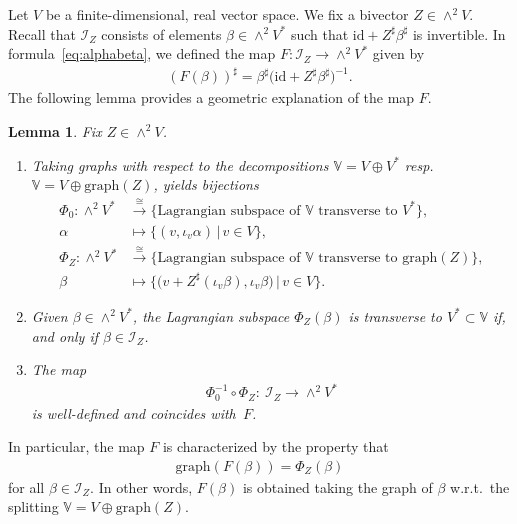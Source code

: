 \documentclass[pdftex]{sigma}
\numberwithin{equation}{section}
\newtheorem{Lemma}[Theorem]{Lemma}
\newcommand{\id}{\mathrm{id}}
\newcommand{\V}{\mathbb{V}}
\begin{document}
Let $V$ be a finite-dimensional, real vector space. We fix a bivector $Z\in \wedge^2V$. Recall that $\mathcal{I}_Z$ consists of elements $\beta\in \wedge^2 V^*$ such that $\mathrm{id} + Z^\sharp \beta^\sharp $ is invertible. In formula~\eqref{eq:alphabeta}, we defined the map $F \colon \mathcal{I}_Z\to \wedge^2 V^*$ given by
\begin{gather*}
(F (\beta))^\sharp = \beta^\sharp\big(\id + Z^{\sharp}\beta^\sharp\big)^{-1}.\end{gather*}
The following lemma provides a geometric explanation of the map $F$.

\begin{Lemma}\label{lemma: almost Dirac structures} Fix $Z\in \wedge^2V$.\samepage
\begin{enumerate}\itemsep=0pt
\item[$(i)$] Taking graphs with respect to the decompositions $\V=V\oplus V^*$ resp.~$\V=V\oplus \mathrm{graph}(Z)$, yields bijections
\begin{align*}
 \Phi_0\colon \wedge^2 V^* &\stackrel{\cong}{\longrightarrow} \{\textrm{Lagrangian subspace of $\V$ transverse to } V^*\},\\
 {\alpha} & \mapsto \{(v,\iota_v{\alpha})\,|\,v\in V\},\\
 \Phi_Z\colon \wedge^2 V^* &\stackrel{\cong}{\longrightarrow} \{\textrm{Lagrangian subspace of $\V$ transverse to } {\mathrm{graph}(Z)}\},\\
 \beta &\mapsto \big\{\big(v+Z^\sharp(\iota_v\beta),\iota_v\beta\big)\,|\,v\in V\big\}.
\end{align*}
\item[$(ii)$] Given $\beta \in \wedge^2 V^*$, the Lagrangian subspace $\Phi_Z(\beta)$ is transverse to $V^*\subset \V$ if, and only if {$\beta\in \mathcal{I}_Z$}.
\item[$(iii)$]
The map \begin{gather*}\Phi_0^{-1}\circ \Phi_Z\colon \ \mathcal{I}_Z\to \wedge^2 V^*\end{gather*} is well-defined and coincides with~$F$.
\end{enumerate}
\end{Lemma}
In particular, the map $F$ is characterized by the property that
\begin{gather}\label{eq:phizbeta}
\mathrm{graph}(F(\beta))=\Phi_Z(\beta)
\end{gather}
 for all $\beta\in \mathcal{I}_Z$. In other words, $F(\beta)$ is obtained taking the graph of $\beta$ w.r.t.\ the splitting $\V=V\oplus \mathrm{graph}(Z)$.
\end{document}
